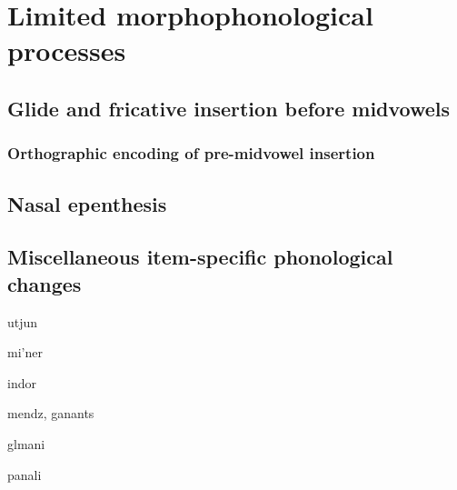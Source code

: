 
\chapter{Limited morphophonological processes}
\section{Glide and fricative  insertion before   midvowels}

\subsection{Orthographic encoding of pre-midvowel insertion}

\section{Nasal epenthesis}
\section{Miscellaneous item-specific phonological changes}

utjun

mi'ner

indor

mendz, ganants

glmani


panali